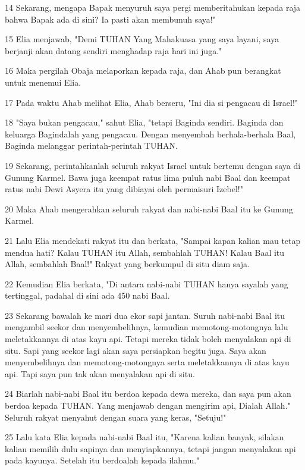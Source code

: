 \par 14 Sekarang, mengapa Bapak menyuruh saya pergi memberitahukan kepada raja bahwa Bapak ada di sini? Ia pasti akan membunuh saya!"
\par 15 Elia menjawab, "Demi TUHAN Yang Mahakuasa yang saya layani, saya berjanji akan datang sendiri menghadap raja hari ini juga."
\par 16 Maka pergilah Obaja melaporkan kepada raja, dan Ahab pun berangkat untuk menemui Elia.
\par 17 Pada waktu Ahab melihat Elia, Ahab berseru, "Ini dia si pengacau di Israel!"
\par 18 "Saya bukan pengacau," sahut Elia, "tetapi Baginda sendiri. Baginda dan keluarga Bagindalah yang pengacau. Dengan menyembah berhala-berhala Baal, Baginda melanggar perintah-perintah TUHAN.
\par 19 Sekarang, perintahkanlah seluruh rakyat Israel untuk bertemu dengan saya di Gunung Karmel. Bawa juga keempat ratus lima puluh nabi Baal dan keempat ratus nabi Dewi Asyera itu yang dibiayai oleh permaisuri Izebel!"
\par 20 Maka Ahab mengerahkan seluruh rakyat dan nabi-nabi Baal itu ke Gunung Karmel.
\par 21 Lalu Elia mendekati rakyat itu dan berkata, "Sampai kapan kalian mau tetap mendua hati? Kalau TUHAN itu Allah, sembahlah TUHAN! Kalau Baal itu Allah, sembahlah Baal!" Rakyat yang berkumpul di situ diam saja.
\par 22 Kemudian Elia berkata, "Di antara nabi-nabi TUHAN hanya sayalah yang tertinggal, padahal di sini ada 450 nabi Baal.
\par 23 Sekarang bawalah ke mari dua ekor sapi jantan. Suruh nabi-nabi Baal itu mengambil seekor dan menyembelihnya, kemudian memotong-motongnya lalu meletakkannya di atas kayu api. Tetapi mereka tidak boleh menyalakan api di situ. Sapi yang seekor lagi akan saya persiapkan begitu juga. Saya akan menyembelihnya dan memotong-motongnya serta meletakkannya di atas kayu api. Tapi saya pun tak akan menyalakan api di situ.
\par 24 Biarlah nabi-nabi Baal itu berdoa kepada dewa mereka, dan saya pun akan berdoa kepada TUHAN. Yang menjawab dengan mengirim api, Dialah Allah." Seluruh rakyat menyahut dengan suara yang keras, "Setuju!"
\par 25 Lalu kata Elia kepada nabi-nabi Baal itu, "Karena kalian banyak, silakan kalian memilih dulu sapinya dan menyiapkannya, tetapi jangan menyalakan api pada kayunya. Setelah itu berdoalah kepada ilahmu."
